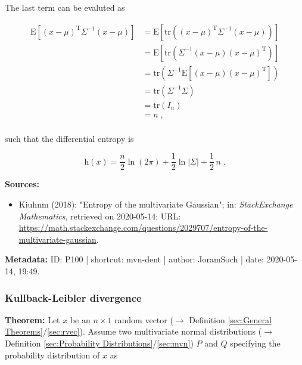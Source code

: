 \documentclass[a4paper,12pt,twoside]{book}
\begin{document}
The last term can be evaluted as

\begin{equation} \label{eq:mvn-dent-mvn-dent-t3}
\begin{split}
\mathrm{E}\left[ (x-\mu)^\mathrm{T} \Sigma^{-1} (x-\mu) \right] &= \mathrm{E}\left[ \mathrm{tr}\left( (x-\mu)^\mathrm{T} \Sigma^{-1} (x-\mu) \right) \right] \\
&= \mathrm{E}\left[ \mathrm{tr}\left( \Sigma^{-1} (x-\mu) (x-\mu)^\mathrm{T} \right) \right] \\
&= \mathrm{tr}\left( \Sigma^{-1} \mathrm{E}\left[ (x-\mu) (x-\mu)^\mathrm{T} \right] \right) \\
&= \mathrm{tr}\left( \Sigma^{-1} \Sigma \right) \\
&= \mathrm{tr}\left( I_n \right) \\
&= n \; , \\
\end{split}
\end{equation}

such that the differential entropy is

\begin{equation} \label{eq:mvn-dent-mvn-dent-qed}
\mathrm{h}(x) = \frac{n}{2} \ln(2\pi) + \frac{1}{2} \ln|\Sigma| + \frac{1}{2} \, n \; .
\end{equation}



\vspace{1em}
\textbf{Sources:}
\begin{itemize}
\item Kiuhnm (2018): "Entropy of the multivariate Gaussian"; in: \textit{StackExchange Mathematics}, retrieved on 2020-05-14; URL: \url{https://math.stackexchange.com/questions/2029707/entropy-of-the-multivariate-gaussian}.
\end{itemize}


\vspace{1em}
\textbf{Metadata:} ID: P100 | shortcut: mvn-dent | author: JoramSoch | date: 2020-05-14, 19:49.
\vspace{1em}



\subsubsection[\textbf{Kullback-Leibler divergence}]{Kullback-Leibler divergence} \label{sec:mvn-kl}
\setcounter{equation}{0}

\textbf{Theorem:} Let $x$ be an $n \times 1$ random vector ($\rightarrow$ Definition \ref{sec:General Theorems}/\ref{sec:rvec}). Assume two multivariate normal distributions ($\rightarrow$ Definition \ref{sec:Probability Distributions}/\ref{sec:mvn}) $P$ and $Q$ specifying the probability distribution of $x$ as
\end{document}
